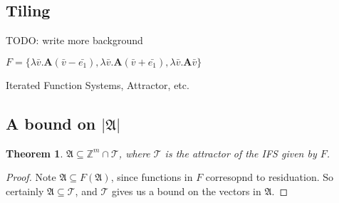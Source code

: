 \documentclass[12pt]{article}
\renewcommand{\P}{\mathfrak{A}}
\newcommand{\Z}{\mathbb{Z}}
\newcommand{\2}{\textbf{2}}
\newcommand{\Am}{\textbf{A}}
\renewcommand{\v}{\bar{v}}
\newcommand{\T}{\mathcal{T}}
\newtheorem{thm}{Theorem}
\begin{document}
\subsection{Tiling}
TODO: write more background

$F = \{\lambda \v . \Am (\v - \bar{e_1})
     ,\lambda \v . \Am (\v + \bar{e_1})
     ,\lambda \v . \Am \v
     \}$

Iterated Function Systems, Attractor, etc.

\subsection{A bound on $|\P|$}

\begin{thm}
  $\P \subseteq \Z^m \cap \T$, where $\T$ is the attractor of the IFS given by $F$.
\end{thm}

\begin{proof}
  Note $\P \subseteq F(\P)$, since functions in $F$ corresopnd to residuation.
  So certainly $\P \subseteq \T$, and $\T$ gives us a bound on the vectors
  in $\P$.
\end{proof}
\end{document}
